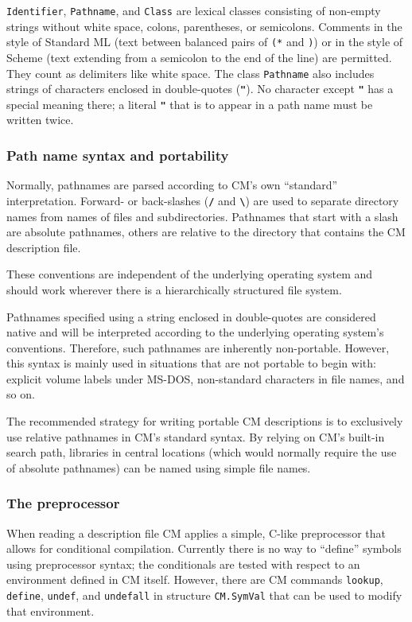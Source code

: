 \documentclass{article}
\begin{document}
{\tt Identifier}, {\tt Pathname}, and {\tt Class} are lexical classes
consisting of non-empty strings without white space, colons,
parentheses, or semicolons.  Comments in the style of
Standard ML (text between balanced pairs of {\tt (*} and {\tt *)}) or
in the style of Scheme (text extending from a semicolon to the end of
the line) are permitted.  They count as delimiters like white space.
The class {\tt Pathname} also includes strings of characters enclosed
in double-quotes ({\bf \verb|"|}).  No character except {\bf \verb|"|}
has a special meaning there; a literal {\bf \verb|"|} that is to
appear in a path name must be written twice.

\subsubsection{Path name syntax and portability}

Normally, pathnames are parsed according to CM's own ``standard''
interpretation.  Forward- or back-slashes ({\bf \verb|/|} and {\bf
\verb|\|}) are used to separate directory names from names of files
and subdirectories.  Pathnames that start with a slash are absolute
pathnames, others are relative to the directory that contains the CM
description file.

These conventions are independent of the underlying operating system
and should work wherever there is a hierarchically structured file
system.

Pathnames specified using a string enclosed in double-quotes are
considered native and will be interpreted according to the underlying
operating system's conventions.  Therefore, such pathnames are
inherently non-portable.  However, this syntax is mainly used in
situations that are not portable to begin with:  explicit volume
labels under MS-DOS, non-standard characters in file names, and so on.

The recommended strategy for writing portable CM descriptions is to
exclusively use relative pathnames in CM's standard syntax.  By
relying on CM's built-in search path, libraries in central locations
(which would normally require the use of absolute pathnames) can be
named using simple file names.

\subsubsection{The preprocessor}

When reading a description file CM applies a simple, C-like
preprocessor that allows for conditional compilation.  Currently there
is no way to ``define'' symbols using preprocessor syntax; the
conditionals are tested with respect to an environment defined in CM
itself.  However, there are CM commands {\tt lookup}, {\tt define},
{\tt undef}, and {\tt undefall} in structure {\tt CM.SymVal} that can
be used to modify that environment.
\end{document}
